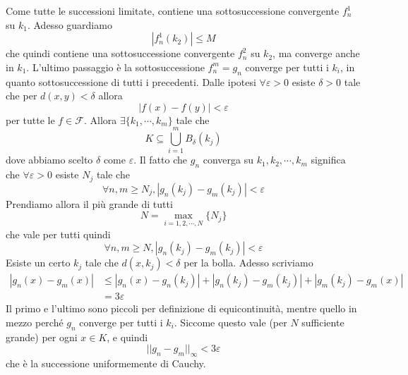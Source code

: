 \documentclass[a4paper]{article}
\begin{document}
{{        Come tutte le successioni limitate, contiene una sottosuccessione convergente
        \(f_n^1\) su \(k_1\).
        Adesso guardiamo
        \[
            |f_n^1(k_2)| \leq M
        \]
        che quindi contiene una sottosuccessione convergente \(f^2_n\) su \(k_2\),
        ma converge anche in \(k_1\). L'ultimo passaggio
        è la sottosuccessione \(f_n^m = g_n\) converge per tutti i \(k_i\), in quanto
        sottosuccessione di tutti i precedenti.
        Dalle ipotesi \(\forall \varepsilon > 0\) esiste \(\delta > 0\)
        tale che per \(d(x,y) < \delta\) allora
        \[
            |f(x) - f(y)| < \varepsilon
        \]
        per tutte le \(f\in\mathcal{F}\).
        Allora \(\exists \{k_1, \cdots, k_m\}\) tale che
        \[
            K \subseteq \bigcup_{i=1}^m B_\delta(k_j)
        \]
        dove abbiamo scelto \(\delta\) come \(\varepsilon\).
        Il fatto che \(g_n\) converga su \(k_1, k_2, \cdots, k_m\)
        significa che \(\forall \varepsilon > 0\) esiste \(N_j\)
        tale che
        \[
            \forall n,m \geq N_j, |g_n(k_j) - g_m(k_j)| < \varepsilon
        \]
        Prendiamo allora il più grande di tutti
        \[
            N = \max_{i=1,2,\cdots, N}\{N_j\}
        \]
        che vale per tutti quindi
        \[
            \forall n,m \geq N, |g_n(k_j) - g_m(k_j)| < \varepsilon
        \]
        Esiste un certo \(k_j\) tale che \(d(x,k_j) < \delta\) per la bolla.
        Adesso scriviamo
        \begin{align*}
            |g_n(x) - g_m(x)| &\leq
            |g_n(x) - g_n(k_j)| +
            |g_n(k_j) - g_m(k_j)|
            + |g_m(k_j) - g_m(x)| \\
            &= 3\varepsilon
        \end{align*}
        Il primo e l'ultimo sono piccoli per definizione di equicontinuità,
        mentre quello in mezzo perché \(g_n\) converge per tutti i \(k_i\).
        Siccome questo vale (per \(N\) sufficiente grande) per ogni \(x\in K\), e quindi
        \[
            ||g_n - g_m||_\infty < 3\varepsilon
        \]
        che è la successione uniformemente di Cauchy.
    }
}

\end{document}
